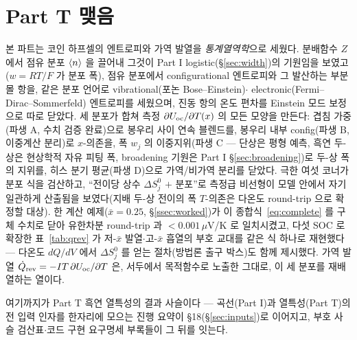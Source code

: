 \section*{Part T 맺음}

본 파트는 코인 하프셀의 엔트로피와 가역 발열을 \emph{통계열역학}으로 세웠다. 분배함수 $Z$ 에서 점유 분포
$\langle n\rangle$ 을 끌어내 그것이 Part I logistic(\S\ref{sec:width})의 기원임을 보였고($w=RT/F$ 가 분포 폭), 점유 분포에서
configurational 엔트로피와 그 발산하는 부분몰 항을, 같은 분포 언어로 vibrational(포논 Bose--Einstein)$\cdot$
electronic(Fermi--Dirac--Sommerfeld) 엔트로피를 세웠으며, 진동 항의 온도 편차를 Einstein 모드 보정으로 따로
닫았다. 세 분포가 합쳐 측정 $\partial U_{\mathrm{oc}}/\partial T(x)$ 의 모든 모양을 만든다: 겹침 가중(파생 A, 수치 검증
완료)으로 봉우리 사이 연속 블렌드를, 봉우리 내부 config(파생 B, 이중계산 분리)로 $x$-의존을, 폭 $w_j$ 의
이중지위(파생 C --- 단상은 평형 예측, 흑연 두-상은 현상학적 자유 피팅 폭, broadening 기원은 Part I
\S\ref{sec:broadening})로
두-상 폭의 지위를, 히스 분기 평균(파생 D)으로 가역/비가역 분리를 닫았다. 극한 여섯 코너가 분포 식을 검산하고,
``전이당 상수 $\Delta S^0_j$ $+$ 분포''로 측정급 비선형이 모델 안에서 자기일관하게 산출됨을 보였다(지배 두-상
전이의 폭 $T$-의존은 다온도 round-trip 으로 확정할 대상). 한 계산 예제($\bar x{=}0.25$, \S\ref{ssec:worked})가
이 종합식~\eqref{eq:complete} 를 구체 수치로 닫아 유한차분 round-trip 과 $<0.001\,\mu$V/K 로 일치시켰고, 다섯
SOC 로 확장한 표~\ref{tab:qrev} 가 저-$\bar x$ 발열$\cdot$고-$\bar x$ 흡열의 부호 교대를 같은 식 하나로
재현했다 --- 다온도 $dQ/dV$ 에서 $\Delta S^0_j$ 를 얻는 절차(방법론 출구 박스)도 함께 제시했다. 가역 발열
$\dot Q_{\mathrm{rev}}=-IT\,\partial U_{\mathrm{oc}}/\partial T$ 은, 서두에서 목적함수로 노출한 그대로, 이 세 분포를 재배열하는
열이다.

여기까지가 Part T 흑연 열특성의 결과 사슬이다 --- 곡선(Part I)과 열특성(Part T)의 전 입력 인자를 한자리에
모으는 진행 요약이 §18(\S\ref{sec:inputs})로 이어지고, 부호 사슬 검산표$\cdot$코드 구현 요구명세 부록들이
그 뒤를 잇는다.

